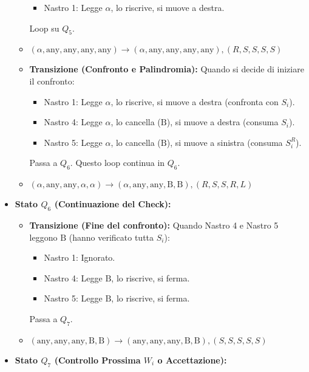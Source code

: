 \documentclass[a4paper, 11pt]{book} %
\theoremstyle{definition}
\newcommand{\B}{\text{B}} %
\newcommand{\alphaSym}{\alpha} %
\begin{document}
\begin{itemize}
\begin{itemize}
\begin{itemize}
                    \item Nastro 1: Legge $\alpha$, lo riscrive, si muove a destra.
                \end{itemize}
                Loop su $Q_5$.
                \item $(\alpha, \text{any}, \text{any}, \text{any}, \text{any}) \to (\alpha, \text{any}, \text{any}, \text{any}, \text{any}), (R,S,S,S,S)$
            \item \textbf{Transizione (Confronto e Palindromia):}
                Quando si decide di iniziare il confronto:
                \begin{itemize}
                    \item Nastro 1: Legge $\alphaSym$, lo riscrive, si muove a destra (confronta con $S_i$).
                    \item Nastro 4: Legge $\alphaSym$, lo cancella ($\B$), si muove a destra (consuma $S_i$).
                    \item Nastro 5: Legge $\alphaSym$, lo cancella ($\B$), si muove a sinistra (consuma $S_i^R$).
                \end{itemize}
                Passa a $Q_6$. Questo loop continua in $Q_6$.
                \item $(\alphaSym, \text{any}, \text{any}, \alphaSym, \alphaSym) \to (\alphaSym, \text{any}, \text{any}, \B, \B), (R,S,S,R,L)$
        \end{itemize}
    \item \textbf{Stato $Q_6$ (Continuazione del Check):}
        \begin{itemize}
            \item \textbf{Transizione (Fine del confronto):}
                Quando Nastro 4 e Nastro 5 leggono $\B$ (hanno verificato tutta $S_i$):
                \begin{itemize}
                    \item Nastro 1: Ignorato.
                    \item Nastro 4: Legge $\B$, lo riscrive, si ferma.
                    \item Nastro 5: Legge $\B$, lo riscrive, si ferma.
                \end{itemize}
                Passa a $Q_7$.
                \item $(\text{any}, \text{any}, \text{any}, \B, \B) \to (\text{any}, \text{any}, \text{any}, \B, \B), (S,S,S,S,S)$
        \end{itemize}
    \item \textbf{Stato $Q_7$ (Controllo Prossima $W_i$ o Accettazione):}

\end{itemize}
\end{document}
